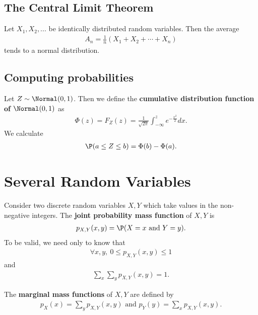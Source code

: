 \documentclass{article}
\begin{document}
\subsection{The Central Limit Theorem}


\begin{theorem}
	Let $X_1,X_2,...$ be identically distributed random variables.
	Then the average
	\begin{align*}
		A_n=\frac{1}{n}\left(X_1+X_2+\cdots+X_n\right)
	\end{align*}
	tends to a normal distribution.
\end{theorem}


\subsection{Computing probabilities}


\begin{definition}
	Let $Z\sim\Normal(0,1)$. Then we define the \textbf{cumulative distribution
		function of $\Normal(0,1)$} as
	\begin{align*}
		\Phi(z)=F_Z(z) = \frac{1}{\sqrt{2\pi}}\int_{-\infty}^z e^{-\frac{x^2}{2}}dx.
	\end{align*}
	We calculate
	\begin{align*}
		\P(a\leq Z\leq b) = \Phi(b)-\Phi(a).
	\end{align*}
\end{definition}


\section{Several Random Variables}


\begin{definition}
	Consider two discrete random variables $X,Y$ which take values in the non-negative
	integers. The \textbf{joint probability mass function} of $X,Y$ is
	\begin{align*}
		p_{X,Y} (x,y) = \P(X=x\text{ and } Y = y).
	\end{align*}
	To be valid, we need only to know that
	\begin{align*}
		\forall x,y,\: 0\leq p_{X,Y}(x,y) \leq 1
	\end{align*}
	and
	\begin{align*}
		\sum_x \sum_y p_{X,Y}(x,y) = 1.
	\end{align*}
\end{definition}

\begin{definition}
	The \textbf{marginal mass functions} of $X,Y$ are defined by
	\begin{align*}
		p_X (x) = \sum_y p_{X,Y} (x,y) \text{ and } p_Y(y)=\sum_x p_{X,Y}(x,y).
	\end{align*}
\end{definition}
\end{document}
